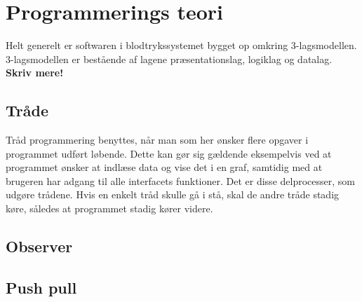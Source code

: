 \section{Programmerings teori}
Helt generelt er softwaren i blodtrykssystemet bygget op omkring 3-lagsmodellen. 3-lagsmodellen er bestående af lagene præsentationslag, logiklag og datalag. \textbf{Skriv mere!}
\subsection{Tråde}
Tråd programmering benyttes, når man som her ønsker flere opgaver i programmet udført løbende. Dette kan gør sig gældende eksempelvis ved at programmet ønsker at indlæse data og vise det i en graf, samtidig med at brugeren har adgang til alle interfacets funktioner. Det er disse delprocesser, som udgøre trådene. Hvis en enkelt tråd skulle gå i stå, skal de andre tråde stadig køre, således at programmet stadig kører videre. 
\subsection{Observer}
\subsection{Push pull}

